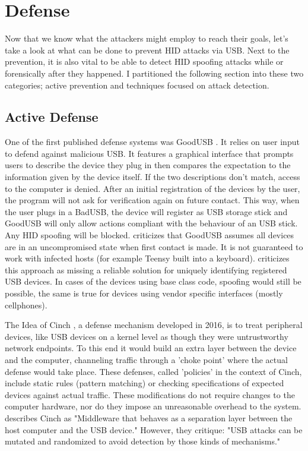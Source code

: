 \section{Defense}

Now that we know what the attackers might employ to reach their goals, let's take a look at what can be done to prevent HID attacks via USB. 
Next to the prevention, it is also vital to be able to detect HID spoofing attacks while or forensically after they happened. 
I partitioned the following section into these two categories; active prevention and techniques focused on attack detection.

\subsection{Active Defense}

One of the first published defense systems was GoodUSB \cite{tianDefendingMaliciousUSB2015}. It relies on user input to defend against malicious USB. It features a graphical interface that prompts users to describe the device they plug in then compares the expectation to the information given by the device itself. If the two descriptions don't match, access to the computer is denied. After an initial registration of the devices by the user, the program will not ask for verification again on future contact. This way, when the user plugs in a BadUSB, the device will register as USB storage stick and GoodUSB will only allow actions compliant with the behaviour of an USB stick. Any HID spoofing will be blocked.
\cite{nissimUSBbasedAttacks2017} criticizes that GoodUSB assumes all devices are in an uncompromised state when first contact is made. It is not guaranteed to work with infected hosts (for example Teensy built into a keyboard). 
\cite{mohammadmoradiMakingWhitelistingBasedDefense2018} criticizes this approach as missing a reliable solution for uniquely identifying registered USB devices. In cases of the devices using base class code, spoofing would still be possible, the same is true for devices using vendor specific interfaces (mostly cellphones). 

The Idea of Cinch \cite{angelDefendingMaliciousPeripherals2016}, a defense mechanism developed in 2016, is to treat peripheral devices, like USB devices on a kernel level as though they were untrustworthy network endpoints. To this end it would build an extra layer between the device and the computer, channeling traffic through a 'choke point' where the actual defense would take place. These defenses, called 'policies' in the context of Cinch, include static rules (pattern matching) or checking specifications of expected devices against actual traffic. 
These modifications do not require changes to the computer hardware, nor do they impose an unreasonable overhead to the system.
\cite{farhiMalboardNovelUser2019} describes Cinch as "Middleware that behaves as a separation layer between the host computer and the USB device." However, they critique: "USB attacks can be mutated and randomized to avoid detection by those kinds of mechanisms."

